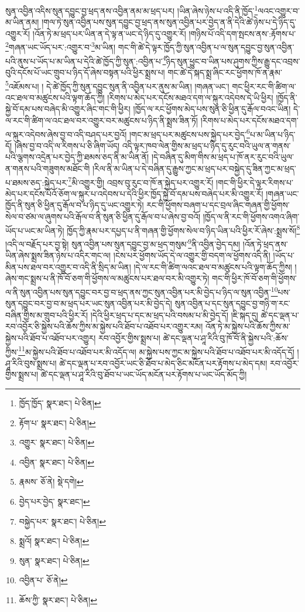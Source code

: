 སུན་འབྱིན་འདིས་སུན་དབྱུང་བྱ་ཕྲད་ནས་འབྱིན་ནམ་མ་ཕྲད་པར། །ཡིན་ཞེས་ཉེས་པ་འདི་ནི་ཁྱོད་\footnote{ཁྱོད་ཁྱོད་  སྣར་ཐང་།  པེ་ཅིན། }ལའང་འགྱུར་བ་མ་ཡིན་ནམ། །གལ་ཏེ་སུན་འབྱིན་པས་སུན་དབྱུང་བྱ་ཕྲད་ནས་སུན་འབྱིན་པར་བྱེད་ན་ནི་དེའི་ཚེ་ཉེས་པ་དེ་ཉིད་དུ་འགྱུར་རོ། །འོན་ཏེ་མ་ཕྲད་པར་ཡིན་ན་དེ་ལྟ་ན་ཡང་དེ་ཉིད་དུ་འགྱུར་རོ། །གཉིས་པོ་འདི་དག་སྤངས་ནས་:རྟོགས་པ་\footnote{རྟོག་པ་  སྣར་ཐང་།  པེ་ཅིན། }གཞན་ཡང་ཡོད་པར་:འགྱུར་བ་\footnote{འགྱུར་  སྣར་ཐང་།  པེ་ཅིན། }མ་ཡིན། གང་གི་ཚེ་དེ་ལྟར་ཁྱོད་ཀྱི་སུན་འབྱིན་པ་ལ་སུན་དབྱུང་བྱ་སུན་འབྱིན་པའི་ནུས་པ་ཡོད་པ་མ་ཡིན་པ་དེའི་ཚེ་ཁྱོད་ཀྱི་སུན་:འབྱིན་པ་\footnote{འབྱིན་  སྣར་ཐང་།  པེ་ཅིན། }ཉིད་སུན་ཕྱུང་བ་ཡིན་པས་ཤུགས་ཀྱིས་རྒྱུ་དང་འབྲས་བུའི་དངོས་པོ་ཡང་གྲུབ་པ་ཉིད་དོ་ཞེས་བསྟན་པའི་ཕྱིར་སྨྲས་པ། གང་ཚེ་དེ་སྐད་སྨྲ་ཞིང་རང་ཕྱོགས་ཁོ་ན་རྣམ་\footnote{རྣམས་  ཅོ་ནེ།  སྡེ་དགེ། }འཇོམས་པ། །
དེ་ཚེ་ཁྱོད་ཀྱི་སུན་དབྱུང་སུན་ནི་འབྱིན་པར་ནུས་མ་ཡིན། །གཞན་ཡང་། གང་ཕྱིར་རང་གི་ཚིག་ལ་འང་ཐལ་བ་མཚུངས་པའི་ལྟག་ཆོད་ཀྱི། །རིགས་པ་མེད་པར་དངོས་མཐའ་དག་ལ་སྐུར་འདེབས་དེ་ཡི་ཕྱིར། །ཁྱོད་ནི་སྐྱེ་བོ་དམ་པས་བཞེད་མི་འགྱུར་ཞིང་གང་གི་ཕྱིར། །ཁྱོད་ལ་རང་ཕྱོགས་མེད་པས་སུན་ཅི་ཕྱིན་དུ་རྒོལ་བའང་ཡིན། དེ་ལ་རང་གི་ཚིག་ལ་འང་ཐལ་བར་འགྱུར་བར་མཚུངས་པ་ཉིད་ནི་སྨྲས་ཟིན་ཏོ། །རིགས་པ་མེད་པར་དངོས་མཐའ་དག་ལ་སྐུར་འདེབས་ཞེས་བྱ་བ་འདི་བཤད་པར་བྱའོ། །གང་མ་ཕྲད་པར་མཚུངས་པས་སྐྱེད་པར་བྱེད་\footnote{བྱེད་པར་བྱེད་  སྣར་ཐང་། }པ་མ་ཡིན་པ་ཉིད་དོ། །ཞེས་བྱ་བ་འདི་ལ་རིགས་པ་ཅི་ཞིག་ཡོད། འདི་ལྟར་ཁབ་ལེན་གྱིས་མ་ཕྲད་པ་ཉིད་དུ་རུང་བའི་ཡུལ་ན་གནས་པའི་ལྕགས་འདྲེན་པར་བྱེད་ཀྱི་ཐམས་ཅད་ནི་མ་ཡིན་ནོ། །དེ་བཞིན་དུ་མིག་གིས་མ་ཕྲད་པ་ཁོ་ནར་རུང་བའི་ཡུལ་ན་གནས་པའི་གཟུགས་མཐོང་གི །རིལ་ནི་མ་ཡིན་པ་དེ་བཞིན་དུ་རྒྱུས་ཀྱང་མ་ཕྲད་པར་བསྐྱེད་དུ་ཟིན་ཀྱང་མ་ཕྲད་པ་ཐམས་ཅད་:སྐྱེད་པར་\footnote{བསྐྱེད་པར་  སྣར་ཐང་།  པེ་ཅིན། }མི་འགྱུར་གྱི། འབྲས་བུ་རུང་བ་ཁོ་ན་སྐྱེད་པར་འགྱུར་རོ། །གང་གི་ཕྱིར་དེ་ལྟར་རིགས་པ་མེད་པར་དངོས་པོའོ་ཅོག་ལ་སྐུར་པ་འདེབས་པ་དེའི་ཕྱིར་ཁྱོད་སྐྱེ་བོ་དམ་པས་བཞེད་པར་མི་འགྱུར་རོ། །གཞན་ཡང་ཁྱོད་ནི་སུན་ཅི་ཕྱིན་དུ་རྒོལ་བ་པ་ཉིད་དུ་ཡང་འགྱུར་ཏེ། རང་གི་ཕྱོགས་བཞག་པ་དང་བྲལ་ཞིང་གཞན་གྱི་ཕྱོགས་སེལ་བ་ཙམ་ལ་ཞུགས་པའི་རྒོལ་བ་ནི་སུན་ཅི་ཕྱིན་དུ་རྒོལ་བ་པ་ཞེས་བྱ་བའོ། །ཁྱོད་ལ་ནི་རང་གི་ཕྱོགས་འགའ་ཞིག་ཡོད་པ་ཡང་མ་ཡིན་ཏེ། ཁྱོད་ཀྱི་རྣམ་པར་དཔྱད་པ་ནི་གཞན་གྱི་ཕྱོགས་སེལ་བ་ཉིད་ཡིན་པའི་ཕྱིར་རོ་ཞེས་:སྨྲས་སོ།\footnote{སྨྲའོ།  སྣར་ཐང་།  པེ་ཅིན། } །འདི་ལ་བརྗོད་པར་བྱ་སྟེ། སུན་འབྱིན་པས་སུན་དབྱུང་བྱ་མ་ཕྲད་གསུམ་\footnote{སུན་  སྣར་ཐང་།  པེ་ཅིན། }ནི་འབྱིན་བྱེད་དམ། །འོན་ཏེ་ཕྲད་ནས་ཡིན་ཞེས་སྨྲས་ཟིན་ཉེས་པ་འདིར་གང་ལ། །ངེས་པར་ཕྱོགས་ཡོད་དེ་ལ་འགྱུར་གྱི་བདག་ལ་ཕྱོགས་འདི་ནི། །ཡོད་པ་མིན་པས་ཐལ་བར་འགྱུར་བ་འདི་ནི་སྲིད་མ་ཡིན། །དེ་ལ་རང་གི་ཚིག་ལའང་ཐལ་བ་མཚུངས་པའི་ལྟག་ཆོད་ཀྱིས། །ཞེས་གང་སྨྲས་པ་ནི་ཁོ་བོ་ཅག་གི་ཕྱོགས་ལ་མཚུངས་པར་ཐལ་བར་མི་འགྱུར་ཏེ། གང་གི་ཕྱིར་ཁོ་བོ་ཅག་གི་ཕྱོགས་ལ་ནི་སུན་འབྱིན་པས་སུན་དབྱུང་བར་བྱ་བ་ཕྲད་ནས་ཀྱང་སུན་འབྱིན་པར་མི་བྱེད་པ་ཉིད་ལ་སུན་འབྱིན་\footnote{འབྱིན་པ་  ཅོ་ནེ། }པས་སུན་དབྱུང་བར་བྱ་བ་མ་ཕྲད་པར་ཡང་སུན་འབྱིན་པར་མི་བྱེད་དེ། སུན་འབྱིན་པ་དང་སུན་དབྱུང་བྱ་གཉི་ག་རང་བཞིན་གྱིས་མ་གྲུབ་པའི་ཕྱིར་རོ། །དེའི་ཕྱིར་ཕྲད་པ་དང་མ་ཕྲད་པའི་བསམ་པ་མི་བྱེད་དོ། །ཇི་སྐད་དུ། ཚེ་དང་ལྡན་པ་རབ་འབྱོར་ཅི་སྐྱེས་པའི་ཆོས་ཀྱིས་མ་སྐྱེས་པའི་ཐོབ་པ་འཐོབ་པར་འགྱུར་རམ། འོན་ཏེ་མ་སྐྱེས་པའི་ཆོས་ཀྱིས་མ་སྐྱེས་པའི་ཐོབ་པ་འཐོབ་པར་འགྱུར། རབ་འབྱོར་གྱིས་སྨྲས་པ། ཚེ་དང་ལྡན་པ་ཤཱ་རིའི་བུ་ཁོ་བོ་ནི་སྐྱེས་པའི་:ཆོས་ཀྱིས་\footnote{ཆོས་ཀྱི་  སྣར་ཐང་།  པེ་ཅིན། }མ་སྐྱེས་པའི་ཐོབ་པ་འཐོབ་པར་མི་འདོད་ལ། མ་སྐྱེས་པས་ཀྱང་མ་སྐྱེས་པའི་ཐོབ་པ་འཐོབ་པར་མི་འདོད་དོ། །ཤཱ་རིའི་བུས་སྨྲས་པ། ཚེ་དང་ལྡན་པ་རབ་འབྱོར་ཡང་ཅི་ཐོབ་པ་མེད་ཅིང་མངོན་པར་རྟོགས་པ་མེད་དམ། རབ་འབྱོར་གྱིས་སྨྲས་པ། ཚེ་དང་ལྡན་པ་ཤཱ་རིའི་བུ་ཐོབ་པ་ཡང་ཡོད་མངོན་པར་རྟོགས་པ་ཡང་ཡོད་མོད་ཀྱི། 